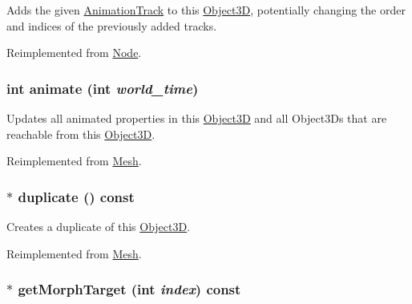 Adds the given \hyperlink{classm3g_1_1AnimationTrack}{AnimationTrack} to this \hyperlink{classm3g_1_1Object3D}{Object3D}, potentially changing the order and indices of the previously added tracks. 

Reimplemented from \hyperlink{classm3g_1_1Node_415c0b110f95410ded9b85e5d99a496b}{Node}.\hypertarget{classm3g_1_1MorphingMesh_8aad1ceab4c2a03609c8a42324ce484d}{
\subsubsection[{animate}]{\setlength{\rightskip}{0pt plus 5cm}int animate (int {\em world\_\-time})}}
\label{classm3g_1_1MorphingMesh_8aad1ceab4c2a03609c8a42324ce484d}


Updates all animated properties in this \hyperlink{classm3g_1_1Object3D}{Object3D} and all Object3Ds that are reachable from this \hyperlink{classm3g_1_1Object3D}{Object3D}. 

Reimplemented from \hyperlink{classm3g_1_1Mesh_8aad1ceab4c2a03609c8a42324ce484d}{Mesh}.\hypertarget{classm3g_1_1MorphingMesh_7e7b2c3c4c988c6341a5e249bd468f57}{
\subsubsection[{duplicate}]{ $\ast$ duplicate () const}}
\label{classm3g_1_1MorphingMesh_7e7b2c3c4c988c6341a5e249bd468f57}


Creates a duplicate of this \hyperlink{classm3g_1_1Object3D}{Object3D}. 

Reimplemented from \hyperlink{classm3g_1_1Mesh_52ce6d0b3eda2bd3a95bfb5b7dbb6f82}{Mesh}.\hypertarget{classm3g_1_1MorphingMesh_44766cc08b595f074d0d698c75f544b4}{
\subsubsection[{getMorphTarget}]{ $\ast$ getMorphTarget (int {\em index}) const}}
\label{classm3g_1_1MorphingMesh_44766cc08b595f074d0d698c75f544b4}


